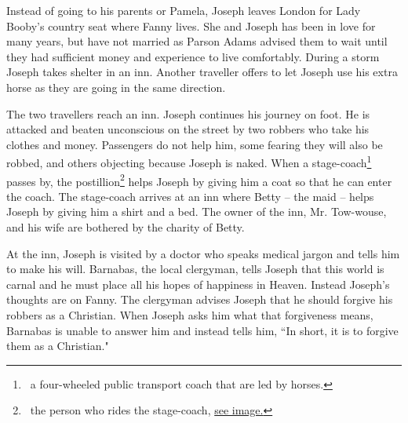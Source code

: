 \documentclass[12pt, a4paper]{article}
\begin{document}

Instead of going to his parents or Pamela, Joseph leaves London for 
Lady Booby's country seat where Fanny lives. She and Joseph has been in
love for many years, but have not married as Parson Adams advised them
to wait until they had sufficient money and experience to live 
comfortably. During a storm Joseph takes shelter in an inn. Another traveller offers
to let Joseph use his extra horse as they are going in the same direction.
  



The two travellers reach an inn. Joseph continues his journey on foot. He
is attacked and beaten unconscious on the street by two robbers who take his clothes
and money. Passengers do not help him, some fearing they will also be
robbed, and others objecting because Joseph is naked. When a stage-coach\footnote{\, 
a four-wheeled public transport coach that are led by horses.} passes by,
the postillion\footnote{\, the person who rides the stage-coach, \textcolor{blue}
{\href{https://westervillelibrary.org/wp-content/uploads/sites/116/2022/01/Drawing-of-Stagecoach.png}
{see image.}}} helps Joseph by giving him a coat so that he can enter the 
coach. The stage-coach arrives at an inn where Betty -- the maid -- helps
Joseph by giving him a shirt and a bed. The owner of the inn, Mr. Tow-wouse,  and his wife 
are bothered by the charity of Betty.


\ind At the inn, Joseph is visited by a doctor who speaks medical jargon and
tells him to make his will. Barnabas, the local clergyman, tells Joseph
that this world is carnal and he must place all his hopes of happiness in
Heaven. Instead Joseph's thoughts are on Fanny. The clergyman advises
Joseph that he should forgive his robbers as a Christian. When Joseph
asks him what that forgiveness means, Barnabas is unable to answer him and
instead tells him, “In short, it is to forgive them as a Christian."
\end{document}
